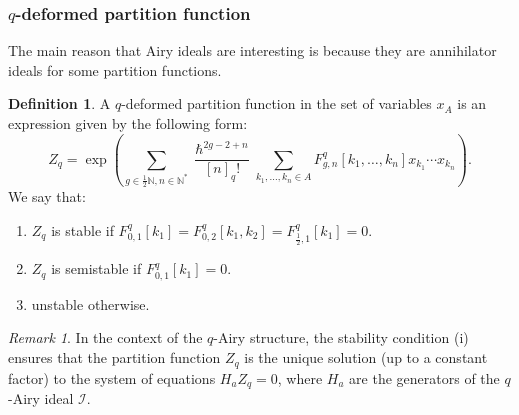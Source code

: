 \documentclass[reqno,11pt]{amsart}
\theoremstyle{plain}
\theoremstyle{definition}
\newtheorem{definition}[theorem]{Definition}
\theoremstyle{remark}
\newtheorem{remark}[theorem]{Remark}
\numberwithin{equation}{section}
\newcommand{\1}{\mathds{1}}
\newcommand{\2}{\frac{1}{2}}
\begin{document}
				\subsubsection{$q$-deformed partition function}
				The main reason that Airy ideals are interesting is because they are annihilator ideals for some partition functions. 
				\begin{definition}\label{d:pf}
					A  $q$-deformed partition function in the set of variables $x_A$ is an expression given by  the following form:
					\begin{equation}\label{eq:pfFgncoeff}
						Z_q = \exp\left( \sum_{g \in \frac{1}{2} \mathbb{N}, n \in \mathbb{N}^*} \frac{\hslash^{2g-2+n}}{[n]_q!}  \sum_{k_1, \ldots, k_n \in A}  F^{q}_{g,n}[k_1, \ldots,k_n]  x_{k_1} \cdots x_{k_n}\right).
					\end{equation}
					We say that:
					\begin{enumerate}
						\item [(i)] $Z_q$ is stable if $F^{q}_{0,1}[k_1]=F^{q}_{0,2}[k_1,k_2]=F^{q}_{\frac{1}{2},1}[k_1] =0$. 
						\item [(ii)] $Z_q$ is semistable if $F^{q}_{0,1}[k_1]=0$.
						\item [(iii)] unstable otherwise.
					\end{enumerate} 
				\end{definition}
				\begin{remark}
					In the context of the  $q$-Airy structure, the stability condition (i) ensures that the partition function $Z_q$ is the unique solution (up to a constant factor) to the system of equations $H_a Z_q = 0$, where $H_a$ are the generators of the  $q$-Airy ideal $\mathcal{I}$.
				\end{remark}
\end{document}
